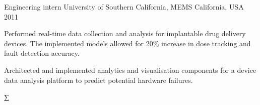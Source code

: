 \begin{cventries}





\cventry
{Engineering intern}
{University of Southern California, MEMS}
{California, USA}
{2011}
{
\begin{cvitems}
\item {Performed real-time data collection and analysis for implantable drug delivery devices. The implemented models allowed for 20\% increase in dose tracking and fault detection accuracy.}
\item {Architected and implemented analytics and visualisation components for a device data analysis platform to predict potential hardware failures.}
\end{cvitems}
}


\end{cventries}∑